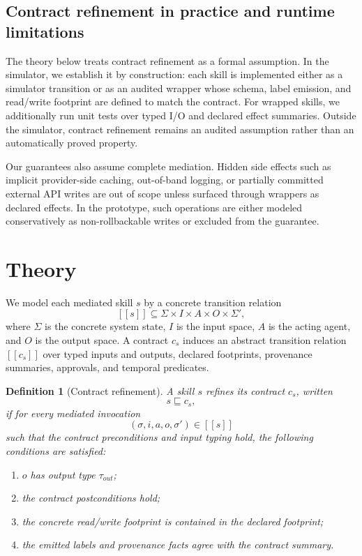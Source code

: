 \documentclass[11pt]{article}
\newtheorem{definition}{Definition}[section]
\newcommand{\sem}[1]{[\![#1]\!]}
\begin{document}
\subsection{Contract refinement in practice and runtime limitations}
The theory below treats contract refinement as a formal assumption. In the simulator, we establish it by construction: each skill is implemented either as a simulator transition or as an audited wrapper whose schema, label emission, and read/write footprint are defined to match the contract. For wrapped skills, we additionally run unit tests over typed I/O and declared effect summaries. Outside the simulator, contract refinement remains an audited assumption rather than an automatically proved property.

Our guarantees also assume complete mediation. Hidden side effects such as implicit provider-side caching, out-of-band logging, or partially committed external API writes are out of scope unless surfaced through wrappers as declared effects. In the prototype, such operations are either modeled conservatively as non-rollbackable writes or excluded from the guarantee.

\section{Theory}
We model each mediated skill $s$ by a concrete transition relation
\[
\sem{s} \subseteq \Sigma \times I \times A \times O \times \Sigma',
\]
where $\Sigma$ is the concrete system state, $I$ is the input space, $A$ is the acting agent, and $O$ is the output space. A contract $c_s$ induces an abstract transition relation $\sem{c_s}$ over typed inputs and outputs, declared footprints, provenance summaries, approvals, and temporal predicates.

\begin{definition}[Contract refinement]
A skill $s$ refines its contract $c_s$, written
\[
s \sqsubseteq c_s,
\]
if for every mediated invocation
\[
(\sigma,i,a,o,\sigma') \in \sem{s}
\]
such that the contract preconditions and input typing hold, the following conditions are satisfied:
\begin{enumerate}
\item $o$ has output type $\tau_{out}$;
\item the contract postconditions hold;
\item the concrete read/write footprint is contained in the declared footprint;
\item the emitted labels and provenance facts agree with the contract summary.
\end{enumerate}
\end{definition}
\end{document}
